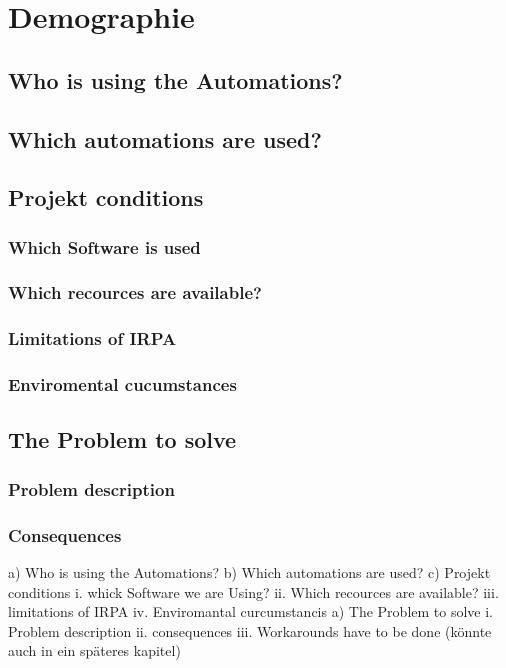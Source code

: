 \chapter{Demographie}
\section{Who is using the Automations?}
\section{Which automations are used?}
\section{Projekt conditions}
\subsection{Which Software is used}
\subsection{Which recources are available?}
\subsection{Limitations of IRPA}
\subsection{Enviromental cucumstances}
\section{The Problem to solve}
\subsection{Problem description}
\subsection{Consequences}



a) Who is using the Automations?
b) Which automations are used?
c) Projekt conditions
i. whick Software we are Using?
ii. Which recources are available?
iii. limitations of IRPA
iv. Enviromantal curcumstancis
a) The Problem to solve
i. Problem description
ii. consequences
iii. Workarounds have to be done (könnte auch in ein späteres kapitel)